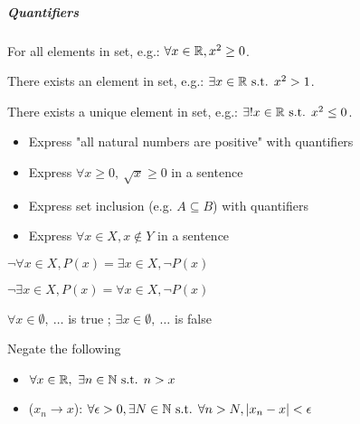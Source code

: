 \subparagraph{Quantifiers}
\begin{notation}[$\forall$]
    For all elements in set, e.g.: $\forall x \in \mathbb{R}, x^2 \geq 0$.
\end{notation}
\begin{notation}[$\exists$]
    There exists an element in set, e.g.: $\exists x \in \mathbb{R} \text{ s.t. } x^2 > 1$.
\end{notation}
\begin{notation}[$\exists !$]
    There exists a unique element in set, e.g.: $\exists ! x \in \mathbb{R} \text{ s.t. } x^2 \leq 0$.
\end{notation}
\begin{question}
    \begin{itemize}
        \item Express "all natural numbers are positive" with quantifiers
        \item Express $\forall x \geq 0, \ \sqrt{x} \geq 0$ in a sentence
        \item Express set inclusion (e.g. $A \subseteq B$) with quantifiers
        \item Express $\forall x \in X, x \not\in Y$ in a sentence
    \end{itemize}
\end{question}
\begin{property}
    $\lnot \forall x\in X, P(x) = \exists x\in X, \lnot P(x)$
\end{property}
\begin{property}
    $\lnot \exists x\in X, P(x) = \forall x\in X, \lnot P(x)$
\end{property}
\begin{notation}
    $\forall x \in \emptyset, \ \dots$ is true ;
    $\exists x \in \emptyset, \ \dots$ is false
\end{notation}
\begin{question} Negate the following
    \begin{itemize}
        \item $\forall x \in \mathbb{R}, \ \exists n \in \mathbb{N} \text{ s.t. } n > x$
        \item ($x_n \to x$): $\forall \epsilon>0, \exists N \in \mathbb{N} \text{ s.t. } \forall n>N, | x_n-x |<\epsilon$
    \end{itemize}
\end{question}


